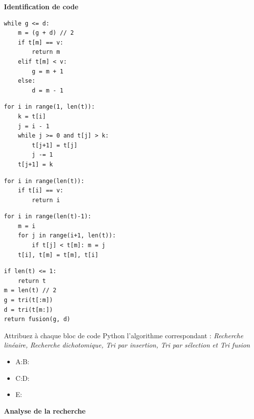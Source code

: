 \documentclass[a4paper, noanswers, addpoints, 12pt]{exam}
\begin{document}
\begin{questions}
\newpage

\question[2\half] \textbf{Identification de code} \\

\begin{minipage}[t]{0.48\textwidth}
\begin{lstlisting}[basicstyle=\scriptsize\ttfamily, title={Code A}]
while g <= d:
    m = (g + d) // 2
    if t[m] == v:
        return m
    elif t[m] < v:
        g = m + 1
    else:
        d = m - 1
\end{lstlisting}
\begin{lstlisting}[basicstyle=\scriptsize\ttfamily, title={Code B}]
for i in range(1, len(t)):
    k = t[i]
    j = i - 1
    while j >= 0 and t[j] > k:
        t[j+1] = t[j]
        j -= 1
    t[j+1] = k
\end{lstlisting}
\end{minipage}
\hfill
\begin{minipage}[t]{0.48\textwidth}
\begin{lstlisting}[basicstyle=\scriptsize\ttfamily, title={Code C}]
for i in range(len(t)):
    if t[i] == v:
        return i
\end{lstlisting}
\begin{lstlisting}[basicstyle=\scriptsize\ttfamily, title={Code D}]
for i in range(len(t)-1):
    m = i
    for j in range(i+1, len(t)):
        if t[j] < t[m]: m = j
    t[i], t[m] = t[m], t[i]
\end{lstlisting}
\begin{lstlisting}[basicstyle=\scriptsize\ttfamily, title={Code E}]
if len(t) <= 1:
    return t
m = len(t) // 2
g = tri(t[:m])
d = tri(t[m:])
return fusion(g, d)
\end{lstlisting}
\end{minipage}

Attribuez à chaque bloc de code Python l'algorithme correspondant :
\textit{Recherche linéaire, Recherche dichotomique, Tri par insertion, Tri par sélection et Tri fusion}
\begin{itemize}
    \item A:\dotfill B:\dotfill
    \item C:\dotfill D:\dotfill
    \item E:\dotfill
\end{itemize}

\question \textbf{Analyse de la recherche}
\begin{parts}

\end{parts}
\end{questions}
\end{document}
